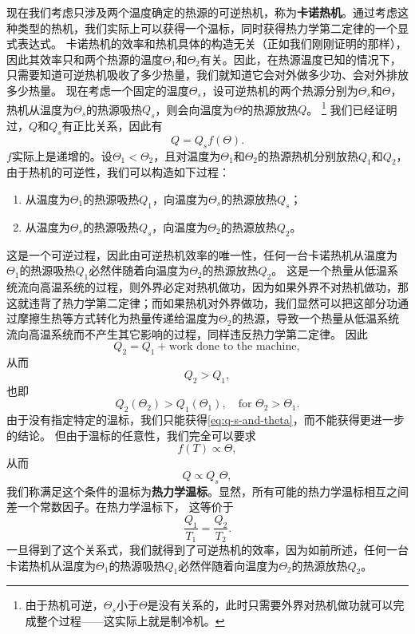 \documentclass[hyperref, UTF8, a4paper]{ctexart}
\begin{document}
现在我们考虑只涉及两个温度确定的热源的可逆热机，称为\textbf{卡诺热机}。通过考虑这种类型的热机，我们实际上可以获得一个温标，同时获得热力学第二定律的一个显式表达式。
卡诺热机的效率和热机具体的构造无关（正如我们刚刚证明的那样），因此其效率只和两个热源的温度$\Theta_1$和$\Theta_2$有关。因此，在热源温度已知的情况下，只需要知道可逆热机吸收了多少热量，我们就知道它会对外做多少功、会对外排放多少热量。
现在考虑一个固定的温度$\Theta_s$，设可逆热机的两个热源分别为$\Theta_s$和$\Theta$，热机从温度为$\Theta_s$的热源吸热$Q_s$，则会向温度为$\Theta$的热源放热$Q$。%
\footnote{由于热机可逆，$\Theta_s$小于$\Theta$是没有关系的，此时只需要外界对热机做功就可以完成整个过程——这实际上就是制冷机。}%
我们已经证明过，$Q$和$Q_s$有正比关系，因此有
\begin{equation}
    Q = Q_s f(\Theta).
    \label{eq:q-s-and-theta}
\end{equation}
$f$实际上是递增的。设$\Theta_1<\Theta_2$，且对温度为$\Theta_1$和$\Theta_2$的热源热机分别放热$Q_1$和$Q_2$，由于热机的可逆性，我们可以构造如下过程：
\begin{enumerate}
    \item 从温度为$\Theta_1$的热源吸热$Q_1$，向温度为$\Theta_s$的热源放热$Q_s$；
    \item 从温度为$\Theta_s$的热源吸热$Q_s$，向温度为$\Theta_2$的热源放热$Q_2$。
\end{enumerate}
这是一个可逆过程，因此由可逆热机效率的唯一性，任何一台卡诺热机从温度为$\Theta_1$的热源吸热$Q_1$必然伴随着向温度为$\Theta_2$的热源放热$Q_2$。
这是一个热量从低温系统流向高温系统的过程，则外界必定对热机做功，因为如果外界不对热机做功，那这就违背了热力学第二定律；而如果热机对外界做功，我们显然可以把这部分功通过摩擦生热等方式转化为热量传递给温度为$\Theta_2$的热源，导致一个热量从低温系统流向高温系统而不产生其它影响的过程，同样违反热力学第二定律。
因此
\[
    Q_2 = Q_1 + \text{work done to the machine},
\]
从而
\[
    Q_2 > Q_1,
\]
也即
\[
    Q_2(\Theta_2) > Q_1(\Theta_1), \quad \text{for } \Theta_2 > \Theta_1.
\]
由于没有指定特定的温标，我们只能获得\eqref{eq:q-s-and-theta}，而不能获得更进一步的结论。
但由于温标的任意性，我们完全可以要求
\[
    f(T) \propto \Theta,
\]
从而
\[
    Q \propto Q_s \Theta,
\]
我们称满足这个条件的温标为\textbf{热力学温标}。显然，所有可能的热力学温标相互之间差一个常数因子。在热力学温标下，
这等价于
\begin{equation}
    \frac{Q_1}{T_1} = \frac{Q_2}{T_2}.
\end{equation}
一旦得到了这个关系式，我们就得到了可逆热机的效率，因为如前所述，任何一台卡诺热机从温度为$\Theta_1$的热源吸热$Q_1$必然伴随着向温度为$\Theta_2$的热源放热$Q_2$。
\end{document}
